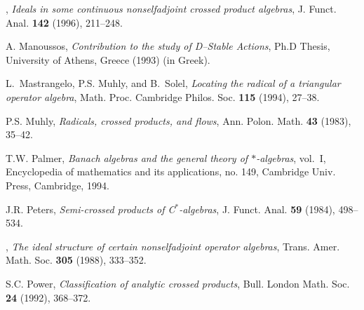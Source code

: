 \documentclass[12pt]{amsart}
\theoremstyle{definition}
\newcommand{\cstar}{C$^*$}
\begin{document}
\begin{thebibliography}{10}
\bysame, \emph{Ideals in some continuous nonselfadjoint crossed product
  algebras}, J. Funct. Anal. \textbf{142} (1996), 211--248.

A. Manoussos, \emph{Contribution
to the study of D--Stable Actions}, Ph.D Thesis, University of Athens,
Greece (1993) (in Greek).

L.~Mastrangelo, P.S. Muhly, and B.~Solel, \emph{Locating the radical of a
  triangular operator algebra}, Math. Proc. Cambridge Philos. Soc. \textbf{115}
  (1994), 27--38.

P.S. Muhly, \emph{Radicals, crossed products, and flows}, Ann. Polon. Math.
  \textbf{43} (1983), 35--42.

T.W. Palmer, \emph{Banach algebras and the general theory of $*$-algebras},
  vol.~I, Encyclopedia of mathematics and its applications, no. 149, Cambridge
  Univ. Press, Cambridge, 1994.

J.R. Peters, \emph{Semi-crossed products of \cstar-algebras}, J. Funct. Anal.
  \textbf{59} (1984), 498--534.

\bysame, \emph{The ideal structure of certain nonselfadjoint operator
  algebras}, Trans. Amer. Math. Soc. \textbf{305} (1988), 333--352.

S.C. Power, \emph{Classification of analytic crossed products}, Bull. London
  Math. Soc. \textbf{24} (1992), 368--372.

\end{thebibliography}
\end{document}
